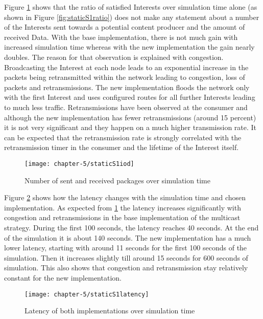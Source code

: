 Figure \ref{fig:staticS1iod} shows that the ratio of satisfied Interests over simulation time alone (as shown in Figure \ref{fig:staticS1ratio}) does not make any statement about a number of the Interests sent towards a potential content producer and the amount of received Data. With the base implementation, there is not much gain with increased simulation time whereas with the new implementation the gain nearly doubles. The reason for that observation is explained with congestion. Broadcasting the Interest at each node leads to an exponential increase in the packets being retransmitted within the network leading to congestion, loss of packets and retransmissions. The new implementation floods the network only with the first Interest and uses configured routes for all further Interests leading to much less traffic. Retransmissions have been observed at the consumer and although the new implementation has fewer retransmissions (around 15 percent) it is not very significant and they happen on a much higher transmission rate. It can be expected that the retransmission rate is strongly correlated with the retransmission timer in the consumer and the lifetime of the Interest itself.

\begin{figure}[H]
  \centering
  \texttt{[image: chapter-5/staticS1iod]}
  \caption{Number of sent and received packages over simulation time}
  \label{fig:staticS1iod}
\end{figure}

Figure \ref{fig:staticS1latency} shows how the latency changes with the simulation time and chosen implementation. As expected from \ref{fig:staticS1iod} the latency increases significantly with congestion and retransmissions in the base implementation of the multicast strategy. During the first 100 seconds, the latency reaches 40 seconds. At the end of the simulation it is about 140 seconds. The new implementation has a much lower latency, starting with around 11 seconds for the first 100 seconds of the simulation. Then it increases slightly till around 15 seconds for 600 seconds of simulation. This also shows that congestion and retransmission stay relatively constant for the new implementation.

\clearpage

\begin{figure}[H]
  \centering
  \texttt{[image: chapter-5/staticS1latency]}
  \caption{Latency of both implementations over simulation time}
  \label{fig:staticS1latency}
\end{figure}

